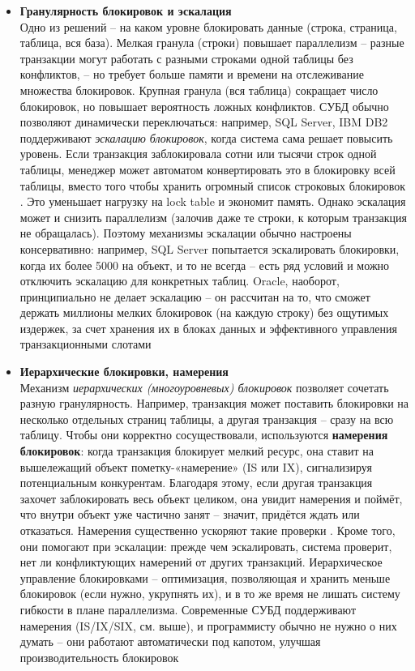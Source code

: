  \begin{itemize}
    \item \textbf{Гранулярность блокировок и эскалация} ~\\
    Одно из решений – на каком уровне блокировать данные (строка, страница, таблица, вся база). Мелкая гранула (строки) повышает параллелизм – разные транзакции могут работать с разными строками одной таблицы без конфликтов, – но требует больше памяти и времени на отслеживание множества блокировок. Крупная гранула (вся таблица) сокращает число блокировок, но повышает вероятность ложных конфликтов. СУБД обычно позволяют динамически переключаться: например, SQL Server, IBM DB2 поддерживают \textit{эскалацию блокировок}, когда система сама решает повысить уровень. Если транзакция заблокировала сотни или тысячи строк одной таблицы, менеджер может автоматом конвертировать это в блокировку всей таблицы, вместо того чтобы хранить огромный список строковых блокировок \autocite{oracleessentialsc7}. Это уменьшает нагрузку на lock table и экономит память. Однако эскалация может и снизить параллелизм (залочив даже те строки, к которым транзакция не обращалась). Поэтому механизмы эскалации обычно настроены консервативно: например, SQL Server попытается эскалировать блокировки, когда их более 5000 на объект, и то не всегда – есть ряд условий и можно отключить эскалацию для конкретных таблиц. Oracle, наоборот, принципиально не делает эскалацию – он рассчитан на то, что сможет держать миллионы мелких блокировок (на каждую строку) без ощутимых издержек, за счет хранения их в блоках данных и эффективного управления транзакционными слотами \autocite{oracleessentialsc7} 
    \item \textbf{Иерархические блокировки, намерения} ~\\
    Механизм \textit{иерархических (многоуровневых) блокировок} позволяет сочетать разную гранулярность. Например, транзакция может поставить блокировки на несколько отдельных страниц таблицы, а другая транзакция – сразу на всю таблицу. Чтобы они корректно сосуществовали, используются \textbf{намерения блокировок}: когда транзакция блокирует мелкий ресурс, она ставит на вышележащий объект пометку-«намерение» (IS или IX), сигнализируя потенциальным конкурентам. Благодаря этому, если другая транзакция захочет заблокировать весь объект целиком, она увидит намерения и поймёт, что внутри объект уже частично занят – значит, придётся ждать или отказаться. Намерения существенно ускоряют такие проверки \autocite{sqlhack1}. Кроме того, они помогают при эскалации: прежде чем эскалировать, система проверит, нет ли конфликтующих намерений от других транзакций. Иерархическое управление блокировками – оптимизация, позволяющая и хранить меньше блокировок (если нужно, укрупнять их), и в то же время не лишать систему гибкости в плане параллелизма. Современные СУБД поддерживают намерения (IS/IX/SIX, см. выше), и программисту обычно не нужно о них думать – они работают автоматически под капотом, улучшая производительность блокировок

\end{itemize}
